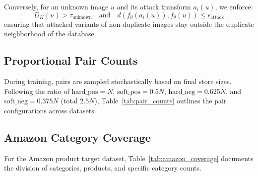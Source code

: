 \documentclass[11pt,a4paper]{article}
\begin{document}
Conversely, for an unknown image $u$ and its attack transform $a_i(u)$, we enforce:
\begin{equation}
    D_K(u) > \tau_{\text{unknown}} \quad \text{and} \quad d(f_{\theta}(a_i(u)), f_{\theta}(u)) \le \epsilon_{\text{attack}}
\end{equation}
ensuring that attacked variants of non-duplicate images stay outside the duplicate neighborhood of the database.

\subsection{Proportional Pair Counts}
During training, pairs are sampled stochastically based on final store sizes. Following the ratio of $\text{hard\_pos} = N$, $\text{soft\_pos} = 0.5N$, $\text{hard\_neg} = 0.625N$, and $\text{soft\_neg} = 0.375N$ (total $2.5N$), Table~\ref{tab:pair_counts} outlines the pair configurations across datasets.

\begin{table}[htbp]
\centering
\caption{Proportional Pair Counts Derived from Final Store Sizes}
\label{tab:pair_counts}
\end{table}

\subsection{Amazon Category Coverage}
For the Amazon product target dataset, Table~\ref{tab:amazon_coverage} documents the division of categories, products, and specific category counts.
\end{document}
